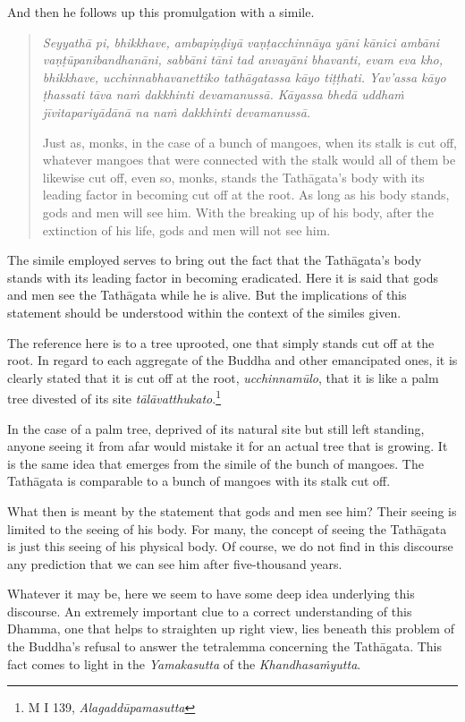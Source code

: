 And then he follows up this promulgation with a simile.

\begin{quote}
\emph{Seyyathā pi, bhikkhave, ambapiṇḍiyā vaṇṭacchinnāya yāni kānici ambāni vaṇṭūpanibandhanāni, sabbāni tāni tad anvayāni bhavanti, evam eva kho, bhikkhave, ucchinnabhavanettiko tathāgatassa kāyo tiṭṭhati. Yav'assa kāyo ṭhassati tāva naṁ dakkhinti devamanussā. Kāyassa bhedā uddhaṁ jīvitapariyādānā na naṁ dakkhinti devamanussā.}

Just as, monks, in the case of a bunch of mangoes, when its stalk is cut off, whatever mangoes that were connected with the stalk would all of them be likewise cut off, even so, monks, stands the Tathāgata's body with its leading factor in becoming cut off at the root. As long as his body stands, gods and men will see him. With the breaking up of his body, after the extinction of his life, gods and men will not see him.
\end{quote}

The simile employed serves to bring out the fact that the Tathāgata's body stands with its leading factor in becoming eradicated. Here it is said that gods and men see the Tathāgata while he is alive. But the implications of this statement should be understood within the context of the similes given.

The reference here is to a tree uprooted, one that simply stands cut off at the root. In regard to each aggregate of the Buddha and other emancipated ones, it is clearly stated that it is cut off at the root, \emph{ucchinnamūlo}, that it is like a palm tree divested of its site \emph{tālāvatthukato}.\footnote{M I 139, \emph{Alagaddūpamasutta}}

In the case of a palm tree, deprived of its natural site but still left standing, anyone seeing it from afar would mistake it for an actual tree that is growing. It is the same idea that emerges from the simile of the bunch of mangoes. The Tathāgata is comparable to a bunch of mangoes with its stalk cut off.

What then is meant by the statement that gods and men see him? Their seeing is limited to the seeing of his body. For many, the concept of seeing the Tathāgata is just this seeing of his physical body. Of course, we do not find in this discourse any prediction that we can see him after five-thousand years.

Whatever it may be, here we seem to have some deep idea underlying this discourse. An extremely important clue to a correct understanding of this Dhamma, one that helps to straighten up right view, lies beneath this problem of the Buddha's refusal to answer the tetralemma concerning the Tathāgata. This fact comes to light in the \emph{Yamakasutta} of the \emph{Khandhasaṁyutta}.

